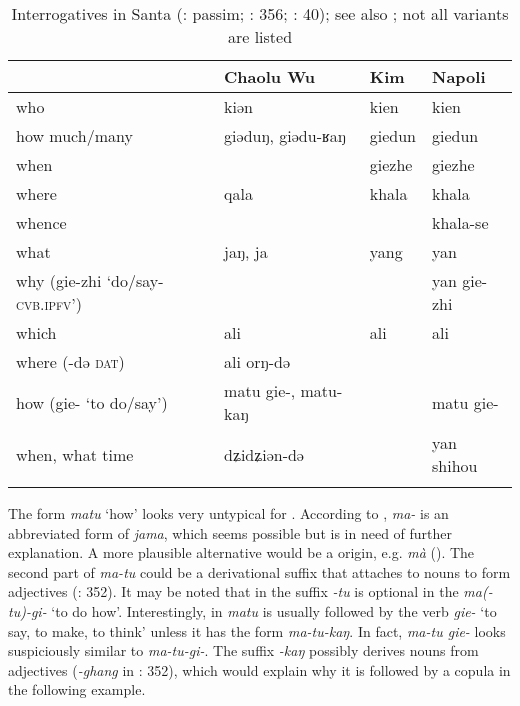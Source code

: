 \begin{table}
\caption{Interrogatives in Santa (\citealt{Chaolu1994b}: passim; \citealt{Kim2003}: 356; \citealt{Napoli2014}: 40); see also \citet[360]{Field1997}; not all variants are listed}
\label{tab:mong:25}

\begin{tabularx}{\textwidth}{llXX}
\lsptoprule
& \textbf{Chaolu Wu} & \textbf{Kim} & \textbf{Napoli}\\
\midrule
who & kiən & kien & kien\\
how much/many & giəduŋ, giədu-ʁaŋ & giedun & giedun\\
when &  & giezhe & giezhe\\
where & qala & khala & khala\\
whence &  &  & khala-se\\
what & jaŋ, ja & yang & yan\\
why (gie-zhi ‘do/say-\textsc{cvb}.\textsc{ipfv}’) &  &  & yan gie-zhi\\
which & ali & ali & ali\\
where (-də \textsc{dat}) & ali orŋ-də &  & \\
how (gie- ‘to do/say’) & matu gie-, matu-kaŋ &  & matu gie-\\
when, what time & dʑidʑiən-də &  & yan shihou\\
\lspbottomrule
\end{tabularx}
\end{table}

The form \textit{matu} ‘how’ looks very untypical for . According to \citet[194]{Siqinchaoketu1999},  \textit{ma-} is an abbreviated form of \textit{jama}, which seems possible but is in need of further explanation. A more plausible alternative would be a  origin, e.g.  \textit{mà} (). The second part of \textit{ma-tu} could be a derivational suffix that attaches to nouns to form adjectives (\citealt{Kim2003}: 352). It may be noted that in  the suffix \textit{-tu} is optional in the  \textit{ma(-tu)-gi-} ‘to do how’. Interestingly, in  \textit{matu} is usually followed by the verb \textit{gie-} ‘to say, to make, to think’ unless it has the form \textit{ma-tu-kaŋ}. In fact,  \textit{ma-tu gie-} looks suspiciously similar to  \textit{ma-tu-gi-}. The suffix \textit{-kaŋ} possibly derives nouns from adjectives (\textit{-ghang} in \citealt{Kim2003}: 352), which would explain why it is followed by a copula in the following example.

